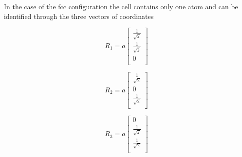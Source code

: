 \documentclass[a4paper]{article}
\begin{document}
    In the case of the fcc configuration the cell contains only one atom and can be identified through the three vectors of coordinates\\
    \begin{minipage}{0.3\textwidth}
    \centering
    \begin{equation*}
    R_1 = a
    \begin{bmatrix}
        \frac{1}{\sqrt{2}} \\
        \frac{1}{\sqrt{2}} \\
        0 \\
        
    \end{bmatrix}
    \end{equation*}
    
    \end{minipage}
    \begin{minipage}{0.3\textwidth}
    \centering
    \begin{equation*}
    R_2 = a
    \begin{bmatrix}
        \frac{1}{\sqrt{2}} \\
        0 \\
        \frac{1}{\sqrt{2}} \\
    \end{bmatrix}
    \end{equation*}
    \end{minipage}
    \begin{minipage}{0.3\textwidth}
    \centering
    \begin{equation*}
    R_3 = a
    \begin{bmatrix}
        0 \\
        \frac{1}{\sqrt{2}}  \\
        \frac{1}{\sqrt{2}} \\
    \end{bmatrix}
    \end{equation*}
    \end{minipage}
    
    
    
\end{document}
